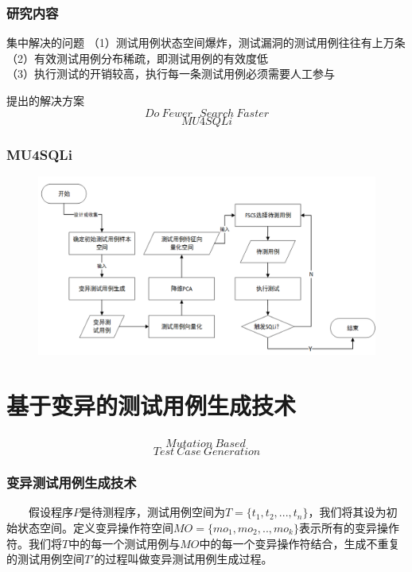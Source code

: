 \documentclass{beamer}
\begin{document}
\begin{CJK*}{UTF8}{}
\begin{frame}
\frametitle{研究内容}
\begin{block}{集中解决的问题}
\medskip
（1）测试用例状态空间爆炸，测试漏洞的测试用例往往有上万条\\
\medskip
\medskip
（2）有效测试用例分布稀疏，即测试用例的有效度低\\
\medskip
\medskip
（3）执行测试的开销较高，执行每一条测试用例必须需要人工参与\\
\medskip
\end{block}
\begin{block}{提出的解决方案}
$$Do ~Fewer~~~ Search~ Faster$$
$$MU4SQLi$$
\end{block}
\end{frame}
\begin{frame}
\frametitle{MU4SQLi}
\begin{figure}  
 \centering  
 \includegraphics[width=120mm]{liucheng.png}\\  
\end{figure}
\end{frame}


\section{基于变异的测试用例生成技术}
\begin{frame}
\frametitle{}
$$Mutation ~Based~$$ $$ Test ~Case ~Generation$$

\end{frame}
\begin{frame}
\frametitle{变异测试用例生成技术}
~~~~假设程序$P$是待测程序，测试用例空间为$T=\{t_{1},t_{2},...,t_{n}\}$，我们将其设为初始状态空间。定义变异操作符空间$MO=\{mo_{1},mo_{2},..,mo_{k}\}$表示所有的变异操作符。我们将$T$中的每一个测试用例与$MO$中的每一个变异操作符结合，生成不重复的测试用例空间$T'$的过程叫做变异测试用例生成过程。\bigskip\\
\end{frame}


\end{CJK*}
\end{document}

